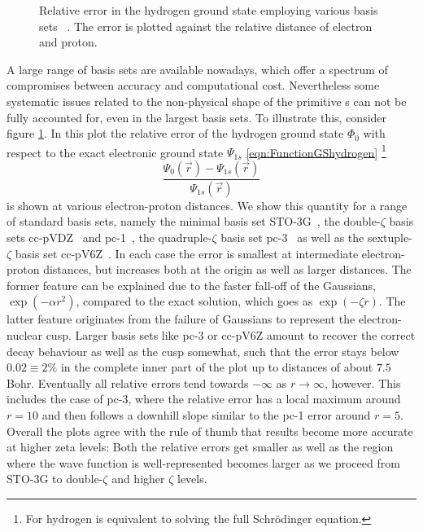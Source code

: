 \begin{figure}
	\centering
	\caption[Relative error in the hydrogen \HF ground state
		for a range of \cGTO basis sets]
	{Relative error in the hydrogen \HF ground state
		employing various \cGTO basis sets~%
		\cite{Hehre1969,Dunning1989,Jensen2001,Wilson1996}.
		The error is plotted against
		the relative distance of electron and proton.
	}
	\label{fig:RelativeErrorCgto}
\end{figure}
A large range of \cGTO basis sets are available nowadays,
which offer a spectrum of compromises between accuracy and computational cost.
Nevertheless some systematic issues related to the non-physical shape
of the primitive {\GTO}s can not be fully accounted for,
even in the largest basis sets.
To illustrate this, consider figure \ref{fig:RelativeErrorCgto}.
In this plot the
relative error of the hydrogen \HF ground state $\Phi_0$
with respect to the exact
electronic ground state $\Psi_{1s}$ \eqref{eqn:FunctionGShydrogen}%
\footnote{For hydrogen \HF is equivalent to solving the full Schrödinger equation.}
\[ \frac{\Psi_0(\vec{r}) - \Psi_{1s}(\vec{r})}{\Psi_{1s}(\vec{r})} \]
is shown at various electron-proton distances.
We show this quantity for a range of standard \cGTO basis sets,
namely the minimal basis set STO-3G~\cite{Hehre1969},
the double-$\zeta$ basis sets cc-pVDZ~\cite{Dunning1989}
and pc-1~\cite{Jensen2001},
the quadruple-$\zeta$ basis set pc-3~\cite{Jensen2001}
as well as the sextuple-$\zeta$ basis set cc-pV6Z~\cite{Wilson1996}.
In each case the error is smallest at intermediate
electron-proton distances, but increases both at the origin
as well as larger distances.
The former feature can be explained due to the faster fall-off
of the Gaussians, $\exp(-\alpha r^2)$,
compared to the exact solution,
which goes as $\exp(-\zeta r)$.
The latter feature originates from the failure of Gaussians
to represent the electron-nuclear cusp.
Larger basis sets like pc-3 or cc-pV6Z amount to recover the
correct decay behaviour as well as the cusp somewhat,
such that the error stays below $0.02 \equiv 2\%$
in the complete inner part of the plot up to distances
of about $7.5$ Bohr.
Eventually all relative errors tend towards $-\infty$ as $r \to \infty$,
however.
This includes the case of pc-3,
where the relative error has a local maximum around $r = 10$
and then follows a downhill slope similar to the pc-1 error around $r = 5$.
Overall the plots agree with the rule of thumb
that results become more accurate at higher zeta levels:
Both the relative errors get smaller as well as the region
where the wave function is well-represented becomes larger
as we proceed from STO-3G to double-$\zeta$ and higher $\zeta$ levels.

